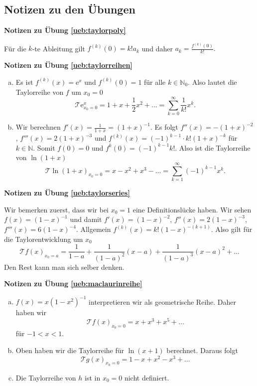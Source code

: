 \documentclass[%
11pt,%
twoside,%
titlepage,%
swissgerman,%
headsepline%
]{scrartcl}
\newcommand{\faReturnGray}{\textcolor{gray}{\faMailReply}} %
\theoremstyle{definition}
\theoremstyle{plain}
\newcommand{\concatueb}[1]{ueb:#1}%
\newcommand{\concatlsg}[1]{lsg:#1}%
\newenvironment{lsg}[1]{%
    \par\noindent\textbf{Notizen zu Übung \ref{\concatueb{#1}}}\label{\concatlsg{#1}}
    \hfill\hyperref[\concatueb{#1}]{\faReturnGray}\par %
}{%
    \par%
}
\begin{document}
\clearpage

\subsection{Notizen zu den Übungen}

\begin{lsg}{taylorpoly}
    Für die $k$-te Ableitung gilt $f^{(k)}(0)=k!a_k$ und daher $a_k=\frac{f^{(k)}(0)}{k!}.$
\end{lsg}
\begin{lsg}{taylorreihen}
    \begin{enumerate}[a)]
        \item Es ist $f^{(k)}(x)=\mathrm{e}^x$ und $f^{(k)}(0)=1$ für alle $k\in\mathbb{N}_0$. Also lautet die Taylorreihe von $f$ um $x_0=0$
        $$\mathcal{T}\mathrm{e}^x_{x_0=0}=1+x+\frac{1}{2}x^2+\dots=\sum_{k=0}^\infty \frac{1}{k!}x^k.$$
        \item Wir berechnen $f'(x)=\frac{1}{1+x}=(1+x)^{-1}$. Es folgt $f''(x)=-(1+x)^{-2}$, $f'''(x)=2(1+x)^{-3}$ und $f^{(k)}(x)=(-1)^{k-1}\cdot k!(1+x)^{-k}$ für $k\in\mathbb{N}$. Somit $f(0)=0$ und $f^{k}(0)=(-1)^{k-1}k!$. Also ist die Taylorreihe von $\ln(1+x)$
        $$\mathcal{T}\ln(1+x)_{x_0=0}=x-x^2+x^3-\dots=\sum_{k=1}^\infty (-1)^{k-1}x^k.$$
    \end{enumerate}
\end{lsg}
\begin{lsg}{taylorseries}
    Wir bemerken zuerst, dass wir bei $x_0=1$ eine Definitionslücke haben. Wir sehen $f(x)=(1-x)^{-1}$ und damit $f'(x)=(1-x)^{-2}$, $f''(x)=2(1-x)^{-3}$, $f'''(x)=6(1-x)^{-4}$. Allgemein $f^{(k)}(x)=k!(1-x)^{-(k+1)}$. Also gilt für die Taylorentwicklung um $x_0$
    $$\mathcal{T}f(x)_{x_0=a}=\frac{1}{1-a}+\frac{1}{(1-a)^2}(x-a)+\frac{1}{(1-a)^3}(x-a)^2+\dots$$
    Den Rest kann man sich selber denken.
\end{lsg}
\begin{lsg}{maclaurinreihe}
    \begin{enumerate}[a)]
        \item $f(x)=x(1-x^2)^{-1}$ interpretieren wir als geometrische Reihe. Daher haben wir
        $$\mathcal{T}f(x)_{x_0=0} = x+x^3+x^5+\dots$$
        für $-1<x<1$.
        \item Oben haben wir die Taylorreihe für $\ln(x+1)$ berechnet. Daraus folgt
        $$\mathcal{T}g(x)_{x_0=0} = 1-x+x^2-x^3+\dots$$
        \item Die Taylorreihe von $h$ ist in $x_0=0$ nicht definiert.
    \end{enumerate}
\end{lsg}
\end{document}
